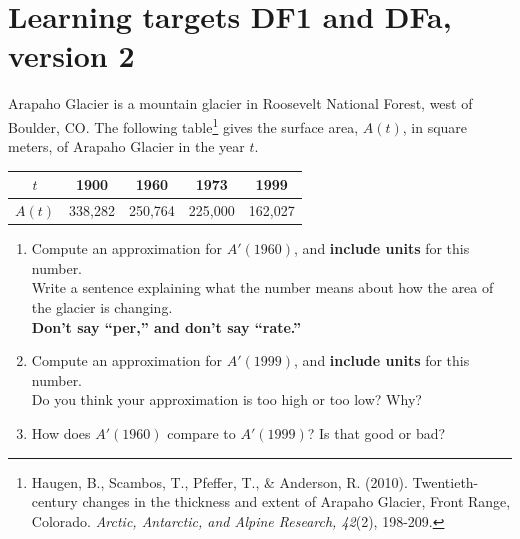 
\usepackage{pgfplots}


%


\allowdisplaybreaks
\section{Learning targets DF1 and DFa, version 2}

Arapaho Glacier is a mountain glacier in Roosevelt National Forest,
west of Boulder, CO. The following table\footnote{
Haugen, B., Scambos, T., Pfeffer, T., \& Anderson, R. (2010). Twentieth-century changes in the thickness and extent of Arapaho Glacier, Front Range, Colorado. \textit{Arctic, Antarctic, and Alpine Research, 42}(2), 198-209.}
gives the surface area, $A(t)$, in square meters, of Arapaho Glacier in the year $t$. 
\begin{center}
	\begin{tabular}{|c|c|c|c|c|}
	\hline
	$t$ & 1900 & 1960 & 1973 & 1999\\
	\hline
	$A(t)$ & 338,282 & 250,764 & 225,000 & 162,027\\
	\hline
	\end{tabular}
 \end{center}
	
\begin{enumerate}[leftmargin=0pt]

\item Compute an approximation for $A'(1960)$, and {\bf include units} for this number.\\
Write a sentence explaining what the number means about how the area of the glacier is changing.\\
\textbf{Don't say ``per,'' and don't say ``rate.''}

\vfill
\vfill

\item Compute an approximation for $A'(1999)$, and {\bf include units} for this number.\\
Do you think your approximation is too high or too low? Why?

\vfill
\vfill

\item How does $A'(1960)$ compare to $A'(1999)$? Is that good or bad?
\vfill
\end{enumerate}

\pagebreak

